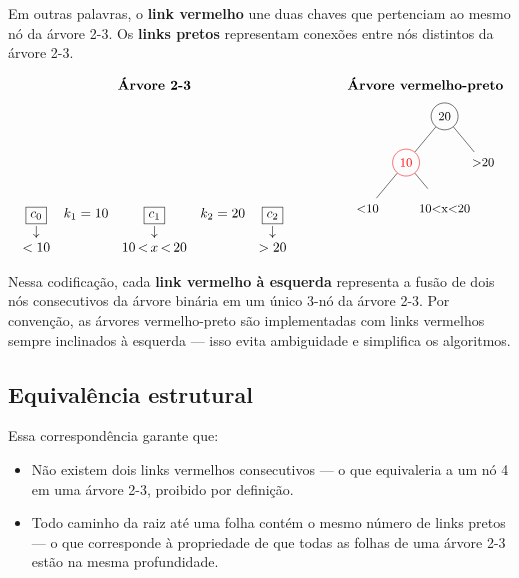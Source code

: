 Em outras palavras, o \textbf{link vermelho} une duas chaves que pertenciam ao mesmo nó da árvore 2-3.
Os \textbf{links pretos} representam conexões entre nós distintos da árvore 2-3.

\begin{center}
\renewcommand{\arraystretch}{1.5}
\[
\begin{array}{ccc}
\textbf{Árvore 2-3} & & \textbf{Árvore vermelho-preto} \\[6pt]

\begin{array}{ccccccc}
  \boxed{c_0} & k_1 = 10 & \boxed{c_1} & k_2 = 20 & \boxed{c_2} \\
  \downarrow  &           & \downarrow  &          & \downarrow  \\
  <10 &
  &
  10{\,<\,}x{\,<\,}20 &
  &
  >20
\end{array}
&\qquad&
\begin{tikzpicture}[level distance=1.2cm,
  every node/.style={circle, minimum size=7mm, inner sep=0pt, font=\small},
  sibling distance=2cm
]
\tikzset{
  preto/.style={draw=black},
  vermelho/.style={draw=red, text=red}
}

\node[preto] (a) {20}
  child {
    node[vermelho] {10}
      child {node {<10}}
      child {node {10<x<20}}
  }
  child {node {>20}};
\end{tikzpicture}
\end{array}
\]
\end{center}


Nessa codificação, cada \textbf{link vermelho à esquerda} representa a fusão de dois nós consecutivos da árvore binária em um único 3-nó da árvore 2-3.
Por convenção, as árvores vermelho-preto são implementadas com links vermelhos sempre inclinados à esquerda — isso evita ambiguidade e simplifica os algoritmos.

\subsection*{Equivalência estrutural}

Essa correspondência garante que:
\begin{itemize}
\item Não existem dois links vermelhos consecutivos — o que equivaleria a um nó 4 em uma árvore 2-3, proibido por definição.
\item Todo caminho da raiz até uma folha contém o mesmo número de links pretos — o que corresponde à propriedade de que todas as folhas de uma árvore 2-3 estão na mesma profundidade.
\end{itemize}

